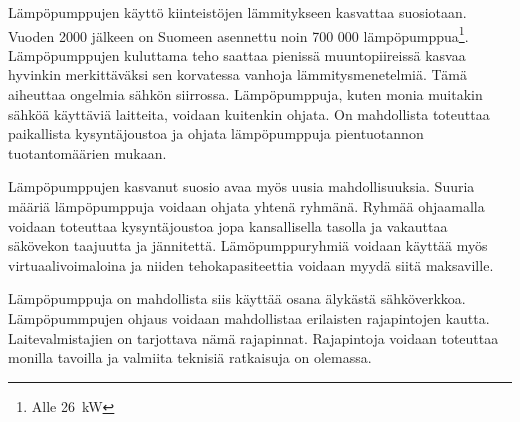 Lämpöpumppujen käyttö kiinteistöjen lämmitykseen kasvattaa suosiotaan. Vuoden 2000 jälkeen on Suomeen asennettu noin 700 000 lämpöpumppua\footnote{Alle \SI{26}{\kilo\watt}}\parencite{kummu}. Lämpöpumppujen kuluttama teho saattaa pienissä muuntopiireissä kasvaa hyvinkin merkittäväksi sen korvatessa vanhoja lämmitysmenetelmiä. Tämä aiheuttaa ongelmia sähkön siirrossa. Lämpöpumppuja, kuten monia muitakin sähköä käyttäviä laitteita, voidaan kuitenkin ohjata. On mahdollista toteuttaa paikallista kysyntäjoustoa ja ohjata lämpöpumppuja pientuotannon tuotantomäärien mukaan.

Lämpöpumppujen kasvanut suosio avaa myös uusia mahdollisuuksia. Suuria määriä lämpöpumppuja voidaan ohjata yhtenä ryhmänä. Ryhmää ohjaamalla voidaan toteuttaa kysyntäjoustoa jopa kansallisella tasolla ja vakauttaa säkövekon taajuutta ja jännitettä. Lämöpumppuryhmiä voidaan käyttää myös virtuaalivoimaloina ja niiden tehokapasiteettia voidaan myydä siitä maksaville\parencite{ShenJiangLi, fischerTriebelSelinger}.

Lämpöpumppuja on mahdollista siis käyttää osana älykästä sähköverkkoa. Lämpöpummpujen ohjaus voidaan mahdollistaa erilaisten rajapintojen kautta. Laitevalmistajien on tarjottava nämä rajapinnat. Rajapintoja voidaan toteuttaa monilla tavoilla ja valmiita teknisiä ratkaisuja on olemassa.
